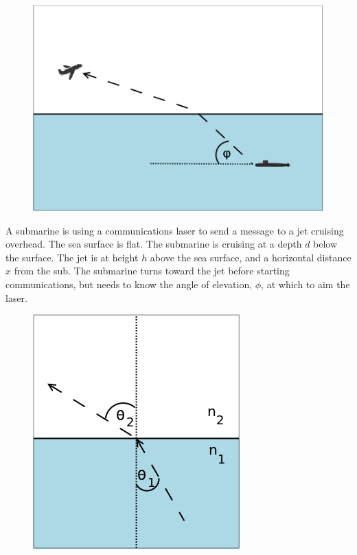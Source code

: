 
\begin{figure}
\includegraphics[width=\linewidth]{Refract/refract.png}
\end{figure}


A submarine is using a communications laser to send a message to a jet
cruising overhead.  The sea surface is flat. The submarine is cruising
at a depth $d$ below the surface. The jet is at height $h$ above the sea
surface, and a horizontal distance $x$ from the sub.  The submarine
turns toward the jet before starting communications, but needs to know
the angle of elevation, $\phi$, at which to aim the laser.

\begin{figure}
\includegraphics[width=\linewidth]{Refract/snell.png}
\end{figure}

